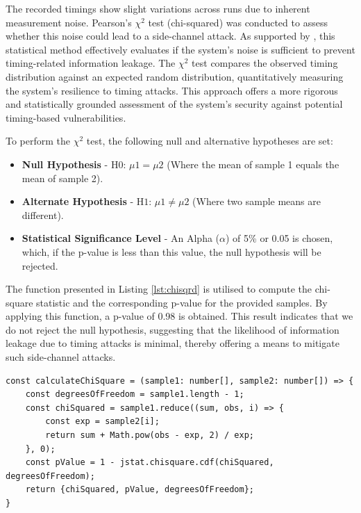 The recorded timings show slight variations across runs due to inherent measurement noise. Pearson's $\chi^2$ test (chi-squared) was conducted to assess whether this noise could lead to a side-channel attack. As supported by \cite{chisquare}, this statistical method effectively evaluates if the system's noise is sufficient to prevent timing-related information leakage. The $\chi^2$ test compares the observed timing distribution against an expected random distribution, quantitatively measuring the system's resilience to timing attacks. This approach offers a more rigorous and statistically grounded assessment of the system's security against potential timing-based vulnerabilities.

To perform the $\chi^2$ test, the following null and alternative hypotheses are set:
\begin{itemize}
    \item \textbf{Null Hypothesis} - H$0$: $\mu1 = \mu2$ (Where the mean of sample 1 equals the mean of sample 2).
    \item \textbf{Alternate Hypothesis} - H$1$: $\mu1 \neq \mu2$  (Where two sample means are different).   
    \item \textbf{Statistical Significance Level} - An Alpha ($\alpha$) of 5\% or 0.05 is chosen, which, if the p-value is less than this value, the null hypothesis will be rejected. 
\end{itemize}

The function presented in Listing \ref{lst:chisqrd} is utilised to compute the chi-square statistic and the corresponding p-value for the provided samples.
By applying this function, a p-value of 0.98 is obtained.
This result indicates that we do not reject the null hypothesis, suggesting that the likelihood of information leakage due to timing attacks is minimal, thereby offering a means to mitigate such side-channel attacks.

\begin{lstlisting}[style=typescript,caption=Chi-Squared Function Written in Typescript ,label=lst:chisqrd]
const calculateChiSquare = (sample1: number[], sample2: number[]) => {
    const degreesOfFreedom = sample1.length - 1;
    const chiSquared = sample1.reduce((sum, obs, i) => {
        const exp = sample2[i];
        return sum + Math.pow(obs - exp, 2) / exp;
    }, 0);
    const pValue = 1 - jstat.chisquare.cdf(chiSquared, degreesOfFreedom);
    return {chiSquared, pValue, degreesOfFreedom};
}
\end{lstlisting}

